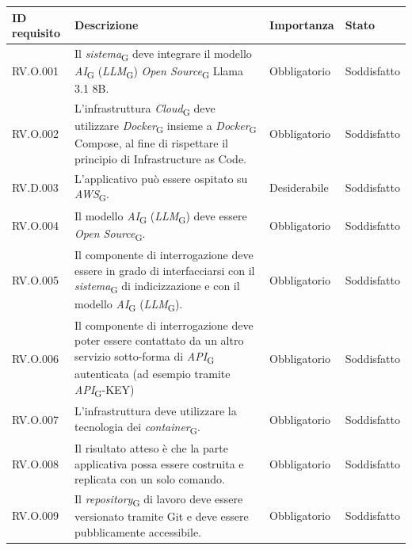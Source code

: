 \begin{table}[H]
\centering
    \begin{tabular}{|C{2.7cm}|L{6.5cm}|C{2.7cm}|C{2.7cm}|}
        \hline
    \textbf{ID requisito} & \textbf{Descrizione} & \textbf{Importanza} & \textbf{Stato}  \\
    \hline
           RV.O.001 & Il \textit{sistema}\textsubscript{G} deve integrare il modello \textit{AI}\textsubscript{G} (\textit{LLM}\textsubscript{G}) \textit{Open Source}\textsubscript{G} Llama 3.1 8B. & Obbligatorio & Soddisfatto \\
          \hline 
          RV.O.002 & L’infrastruttura \textit{Cloud}\textsubscript{G} deve utilizzare \textit{Docker}\textsubscript{G} insieme a \textit{Docker}\textsubscript{G} Compose, al fine di rispettare il principio di Infrastructure as Code. & Obbligatorio & Soddisfatto \\
           \hline
          RV.D.003 & L'applicativo può essere ospitato su \textit{AWS}\textsubscript{G}. & Desiderabile & Soddisfatto \\
          \hline
          RV.O.004 & Il modello \textit{AI}\textsubscript{G} (\textit{LLM}\textsubscript{G}) deve essere \textit{Open Source}\textsubscript{G}.
         & Obbligatorio & Soddisfatto \\
        \hline
        RV.O.005 & Il componente di interrogazione deve essere in grado di interfacciarsi con il \textit{sistema}\textsubscript{G} di indicizzazione e con il modello \textit{AI}\textsubscript{G} (\textit{LLM}\textsubscript{G}).
         & Obbligatorio & Soddisfatto \\
        \hline
        RV.O.006 & Il componente di interrogazione deve poter essere contattato da un altro servizio sotto-forma di \textit{API}\textsubscript{G} autenticata (ad esempio tramite \textit{API}\textsubscript{G}-KEY)
         & Obbligatorio & Soddisfatto \\
         \hline
        RV.O.007 &  L’infrastruttura deve utilizzare la tecnologia dei \textit{container}\textsubscript{G}.
         & Obbligatorio & Soddisfatto \\
        \hline
         RV.O.008 & Il risultato atteso è che la parte applicativa possa essere costruita e replicata con un solo comando.
         & Obbligatorio & Soddisfatto \\
        \hline
        RV.O.009 & Il \textit{repository}\textsubscript{G} di lavoro deve essere versionato tramite Git e deve essere pubblicamente accessibile.
         & Obbligatorio & Soddisfatto \\

\end{tabular}
\end{table}
